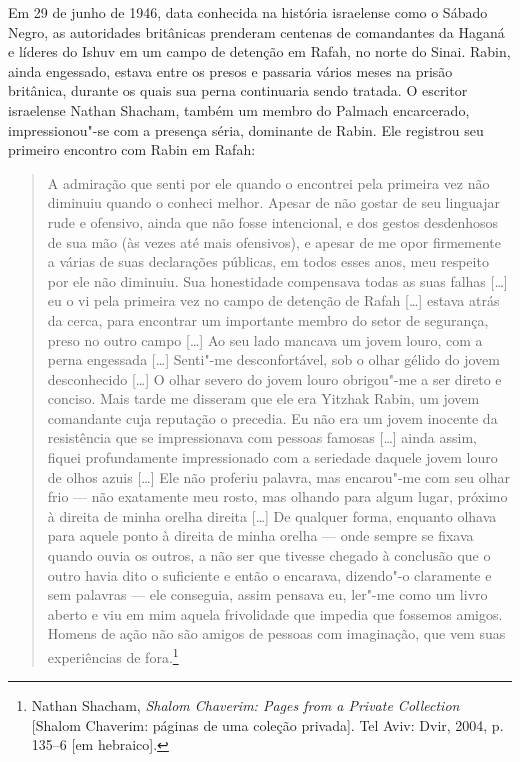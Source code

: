 Em 29 de junho de 1946, data conhecida na história israelense como o Sábado
Negro, as autoridades britânicas prenderam centenas de comandantes da
Haganá e líderes do Ishuv em um campo de detenção em Rafah, no norte do
Sinai. Rabin, ainda engessado, estava entre os presos e passaria vários
meses na prisão britânica, durante os quais sua perna continuaria sendo
tratada. O escritor israelense Nathan Shacham, também um membro do Palmach
encarcerado, impressionou"-se com a presença séria, dominante de Rabin. Ele
registrou seu primeiro encontro com Rabin em Rafah:

\begin{quote}
A admiração que senti por ele quando o encontrei pela primeira vez não
diminuiu quando o conheci melhor. Apesar de não gostar de seu linguajar
rude e ofensivo, ainda que não fosse intencional, e dos gestos desdenhosos de
sua mão (às vezes até mais ofensivos), e apesar de me opor firmemente a
várias de suas declarações públicas, em todos esses anos, meu respeito
por ele não diminuiu. Sua honestidade compensava todas as suas falhas {[}\ldots{}{]}
eu o vi pela primeira vez no campo de detenção de Rafah {[}\ldots{}{]} estava atrás
da cerca, para encontrar um importante membro do setor de segurança,
preso no outro campo {[}\ldots{}{]} Ao seu lado mancava um jovem louro, com a perna
engessada {[}\ldots{}{]} Senti"-me desconfortável, sob o olhar gélido do jovem
desconhecido {[}\ldots{}{]} O olhar severo do jovem louro obrigou"-me a ser direto e
conciso. Mais tarde me disseram que ele era Yitzhak Rabin, um jovem
comandante cuja reputação o precedia. Eu não era um jovem inocente da
resistência que se impressionava com pessoas famosas {[}\ldots{}{]} ainda assim,
fiquei profundamente impressionado com a seriedade daquele jovem louro
de olhos azuis {[}\ldots{}{]} Ele não proferiu palavra, mas encarou"-me com seu olhar
frio --- não exatamente meu rosto, mas olhando para algum lugar, próximo
à direita de minha orelha direita {[}\ldots{}{]} De qualquer forma, enquanto olhava
para aquele ponto à direita de minha orelha --- onde sempre se fixava
quando ouvia os outros, a não ser que tivesse chegado à conclusão que o
outro havia dito o suficiente e então o encarava, dizendo"-o claramente e
sem palavras --- ele conseguia, assim pensava eu, ler"-me como um livro
aberto e viu em mim aquela frivolidade que impedia que fossemos amigos.
Homens de ação não são amigos de pessoas com imaginação, que vem suas
experiências de fora.\footnote{Nathan Shacham, \textit{Shalom Chaverim: Pages from a Private Collection} {[Shalom Chaverim: páginas de uma coleção privada]}. Tel Aviv: Dvir, 2004, p. 135--6 {[}em hebraico{]}.}
\end{quote}

